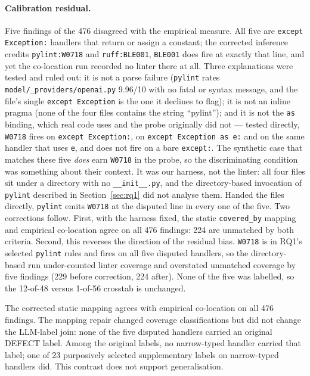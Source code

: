 \documentclass[10pt,a4paper]{article}
\begin{document}
\paragraph{Calibration residual.}
Five findings of the 476 disagreed with the empirical measure. All five are
\texttt{except Exception:} handlers that return or assign a constant; the corrected
inference credits \texttt{pylint:W0718} and \texttt{ruff:BLE001}, \texttt{BLE001}
does fire at exactly that line, and yet the co-location run recorded no linter there
at all. Three explanations were tested and ruled out: it is not a parse failure
(\texttt{pylint} rates \texttt{model/\_providers/openai.py} 9.96/10 with no fatal or
syntax message, and the file's single \texttt{except Exception} is the one it
declines to flag); it is not an inline pragma (none of the four files contains the
string ``pylint''); and it is not the \texttt{as} binding, which real code uses and
the probe originally did not --- tested directly, \texttt{W0718} fires on
\texttt{except Exception:}, on \texttt{except Exception as e:} and on the same
handler that uses \texttt{e}, and does not fire on a bare \texttt{except:}. The
synthetic case that matches these five \emph{does} earn \texttt{W0718} in the probe,
so the discriminating condition was something about their context. It was our
harness, not the linter: all four files sit under a directory with no
\texttt{\_\_init\_\_.py}, and the directory-based invocation of \texttt{pylint} described in
Section~\ref{sec:rq1} did not analyse them. Handed the files
directly, \texttt{pylint} emits \texttt{W0718} at the disputed line in every one of
the five. Two corrections follow. First, with the harness fixed, the static
\texttt{covered\_by} mapping and empirical co-location agree on all 476 findings:
224 are unmatched by both criteria. Second, this reverses the direction of the residual
bias. \texttt{W0718} is in RQ1's selected \texttt{pylint} rules and fires on all
five disputed handlers, so the directory-based run under-counted linter coverage
and overstated unmatched coverage by five findings (229 before correction, 224 after). None
of the five was labelled, so the 12-of-48 versus 1-of-56 crosstab is unchanged.

The corrected static mapping agrees with empirical co-location on all 476
findings. The mapping repair changed coverage classifications but did not change
the LLM-label join: none of the five disputed handlers carried an original
DEFECT label. Among the original labels, no narrow-typed handler carried that
label; one of 23 purposively selected supplementary labels on narrow-typed
handlers did. This contrast does not support generalisation.
\end{document}
